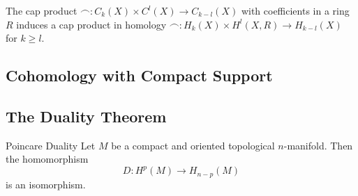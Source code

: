 \documentclass[a4paper]{article}
\begin{document}
\begin{lmm}{}{} The cap product $\frown: C_k(X)\times C^l(X)\to C_{k-l}(X)$ with coefficients in a ring $R$ induces a cap product in homology $\frown: H_k(X)\times H^l(X,R)\to H_{k-l}(X)$ for $k\geq l$. 
\end{lmm}

\subsection{Cohomology with Compact Support}

\subsection{The Duality Theorem}
\begin{thm}{Poincare Duality}{} Let $M$ be a compact and oriented topological $n$-manifold. Then the homomorphism $$D:H^p(M)\to H_{n-p}(M)$$ is an isomorphism. 
\end{thm}
\end{document}
